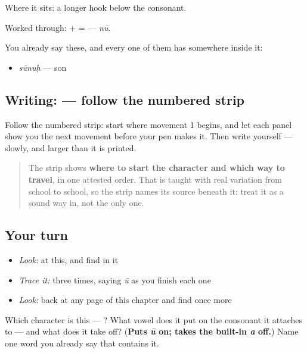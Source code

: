 Where it sits: a longer hook below the consonant.

Worked through: \textbf{} + \textbf{} = \textbf{} — \emph{nū}.

You already say these, and every one of them has  somewhere inside it:

\begin{itemize}
\raggedright
  \item \textbf{} \emph{sūnuḥ} — son
\end{itemize}

\subsection*{Writing:  — follow the numbered strip}

Follow the numbered strip: start where movement 1 begins, and let each panel show you the next movement before your pen makes it. Then write  yourself — slowly, and larger than it is printed.

\begin{quote}
The strip shows \textbf{where to start the character and which way to travel}, in one attested order. That is taught with real variation from school to school, so the strip names its source beneath it: treat it as a sound way in, not the only one.
\end{quote}

\subsection*{Your turn}
\begin{itemize}
\raggedright
  \item \emph{Look:} at this, and find  in it
\end{itemize}

\begin{quote}
\end{quote}

\begin{itemize}
\raggedright
  \item \emph{Trace it:}  three times, saying \emph{ū} as you finish each one
  \item \emph{Look:} back at any page of this chapter and find  once more
\end{itemize}

\begin{tcolorbox}[breakable,colback=teal!4,colframe=teal!35!black,title={Before you move on}]
Which character is this — ? What vowel does it put on the consonant it attaches to — and what does it take off? (\textbf{Puts \emph{ū} on; takes the built-in \emph{a} off.}) Name one word you already say that contains it.
\end{tcolorbox}
